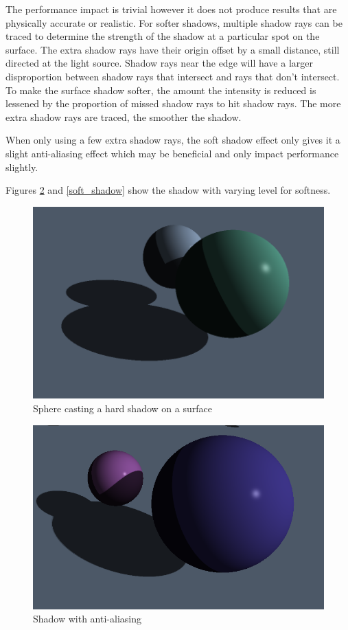 \documentclass[final]{cmpreport}
\begin{document}
The performance impact is trivial however it does not produce results that are physically accurate or realistic. For softer shadows, multiple shadow rays can be traced to determine the strength of the shadow at a particular spot on the surface. The extra shadow rays have their origin offset by a small distance, still directed at the light source. Shadow rays near the edge will have a larger disproportion between shadow rays that intersect and rays that don't intersect. To make the surface shadow softer, the amount the intensity is reduced is lessened by the proportion of missed shadow rays to hit shadow rays. The more extra shadow rays are traced, the smoother the shadow.

When only using a few extra shadow rays, the soft shadow effect only gives it a slight anti-aliasing effect which may be beneficial and only impact performance slightly.

Figures \ref{softish_shadow} and \ref{soft_shadow} show the shadow with varying level for softness.

\begin{figure}
    \centering
    \includegraphics[width=\textwidth]{img/hard_shadow.png}
    \caption{Sphere casting a hard shadow on a surface}
    \label{hard_shadow}
\end{figure}

\begin{figure}
    \centering
    \includegraphics[width=\textwidth]{img/softish_shadow.png}
    \caption{Shadow with anti-aliasing}
    \label{softish_shadow}
\end{figure}
\end{document}
